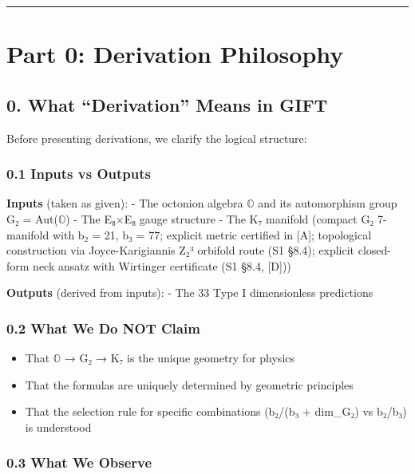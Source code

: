 \documentclass[11pt,a4paper]{article}
\begin{document}
\begin{center}\rule{0.5\linewidth}{0.5pt}\end{center}

\section{Part 0: Derivation Philosophy}\label{part-0-derivation-philosophy}

\subsection{0. What ``Derivation'' Means in GIFT}\label{what-derivation-means-in-gift}

Before presenting derivations, we clarify the logical structure:

\subsubsection{0.1 Inputs vs Outputs}\label{inputs-vs-outputs}

\textbf{Inputs} (taken as given):
- The octonion algebra $\mathbb{O}$ and its automorphism group G₂ = Aut($\mathbb{O}$)
- The E₈×E₈ gauge structure
- The K₇ manifold (compact G₂ 7-manifold with b₂ = 21, b₃ = 77; explicit metric certified in [A]; topological construction via Joyce-Karigiannis Z₂³ orbifold route (S1 §8.4); explicit closed-form neck ansatz with Wirtinger certificate (S1 §8.4, [D]))

\textbf{Outputs} (derived from inputs):
- The 33 Type I dimensionless predictions

\subsubsection{0.2 What We Do NOT Claim}\label{what-we-do-not-claim}

\begin{itemize}
\item
  That $\mathbb{O}$ → G₂ → K₇ is the unique geometry for physics
\item
  That the formulas are uniquely determined by geometric principles
\item
  That the selection rule for specific combinations (b₂/(b₃ + dim\_G₂) vs b₂/b₃) is understood
\end{itemize}

\subsubsection{0.3 What We Observe}\label{what-we-observe}
\end{document}
